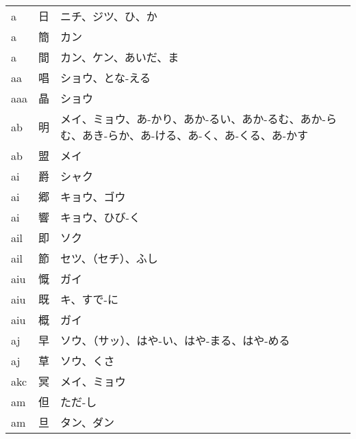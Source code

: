 \documentclass[20pt,dvipdfmx,uplatex]{jsarticle}
\begin{document}
\begin{longtable}{lll}
a & 日 & ニチ、ジツ、ひ、か \\
a & 簡 & カン \\
a & 間 & カン、ケン、あいだ、ま \\
aa & 唱 & ショウ、とな-える \\
aaa & 晶 & ショウ \\
ab & 明 & メイ、ミョウ、あ-かり、あか-るい、あか-るむ、あか-らむ、あき-らか、あ-ける、あ-く、あ-くる、あ-かす \\
ab & 盟 & メイ \\
ai & 爵 & シャク \\
ai & 郷 & キョウ、ゴウ \\
ai & 響 & キョウ、ひび-く \\
ail & 即 & ソク \\
ail & 節 & セツ、（セチ）、ふし \\
aiu & 慨 & ガイ \\
aiu & 既 & キ、すで-に \\
aiu & 概 & ガイ \\
aj & 早 & ソウ、（サッ）、はや-い、はや-まる、はや-める \\
aj & 草 & ソウ、くさ \\
akc & 冥 & メイ、ミョウ \\
am & 但 & ただ-し \\
am & 旦 & タン、ダン \\
\end{longtable}
\end{document}
